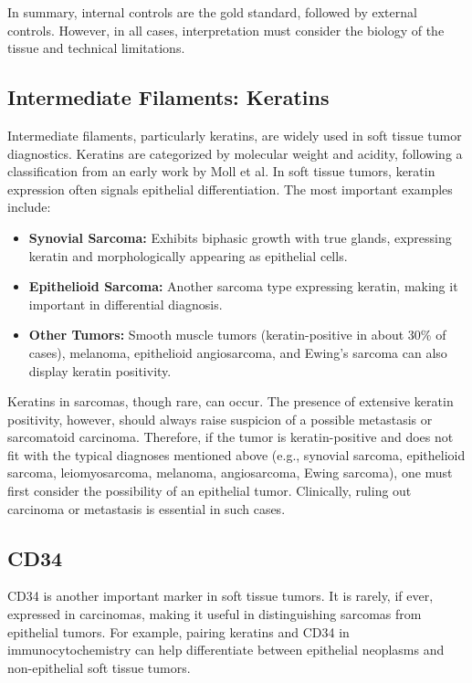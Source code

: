 \noindent
In summary, internal controls are the gold standard, followed by external controls. However, in all cases, interpretation must consider the biology of the tissue and technical limitations.

\subsection{Intermediate Filaments: Keratins}
Intermediate filaments, particularly keratins, are widely used in soft tissue tumor diagnostics. Keratins are categorized by molecular weight and acidity, following a classification from an early work by Moll et al. In soft tissue tumors, keratin expression often signals epithelial differentiation. The most important examples include:

\begin{itemize}
    \item \textbf{Synovial Sarcoma:} Exhibits biphasic growth with true glands, expressing keratin and morphologically appearing as epithelial cells.
    \item \textbf{Epithelioid Sarcoma:} Another sarcoma type expressing keratin, making it important in differential diagnosis.
    \item \textbf{Other Tumors:} Smooth muscle tumors (keratin-positive in about 30\% of cases), melanoma, epithelioid angiosarcoma, and Ewing's sarcoma can also display keratin positivity.
\end{itemize}

Keratins in sarcomas, though rare, can occur. The presence of extensive keratin positivity, however, should always raise suspicion of a possible metastasis or sarcomatoid carcinoma. Therefore, if the tumor is keratin-positive and does not fit with the typical diagnoses mentioned above (e.g., synovial sarcoma, epithelioid sarcoma, leiomyosarcoma, melanoma, angiosarcoma, Ewing sarcoma), one must first consider the possibility of an epithelial tumor. Clinically, ruling out carcinoma or metastasis is essential in such cases.

\subsection{CD34}
CD34 is another important marker in soft tissue tumors. It is rarely, if ever, expressed in carcinomas, making it useful in distinguishing sarcomas from epithelial tumors. For example, pairing keratins and CD34 in immunocytochemistry can help differentiate between epithelial neoplasms and non-epithelial soft tissue tumors.

